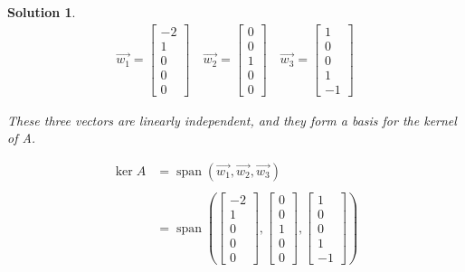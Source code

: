 \documentclass{article}
\newtheorem*{solution}{Solution}
\DeclareMathOperator{\Span}{span}
\begin{document}
\begin{solution}
\begin{align*}
\vec{w_{1}} = \begin{bmatrix} -2 \\ 1 \\ 0 \\ 0 \\ 0 \end{bmatrix} \quad \vec{w_{2}} = \begin{bmatrix} 0 \\ 0 \\ 1 \\ 0 \\ 0 \end{bmatrix} \quad \vec{w_{3}} = \begin{bmatrix} 1 \\ 0 \\ 0 \\ 1 \\ -1 \end{bmatrix}
\end{align*}

These three vectors are linearly independent, and they form a basis for the kernel of A.

\begin{align*}
\ker A &= \Span \left( \vec{w_{1}}, \vec{w_{2}}, \vec{w_{3}} \right) \\ \\
&= \Span \left( \begin{bmatrix} -2 \\ 1 \\ 0 \\ 0 \\ 0 \end{bmatrix}, \begin{bmatrix} 0 \\ 0 \\ 1 \\ 0 \\ 0 \end{bmatrix}, \begin{bmatrix} 1 \\ 0 \\ 0 \\ 1 \\ -1 \end{bmatrix} \right) 
\end{align*}

\end{solution}
\end{document}
